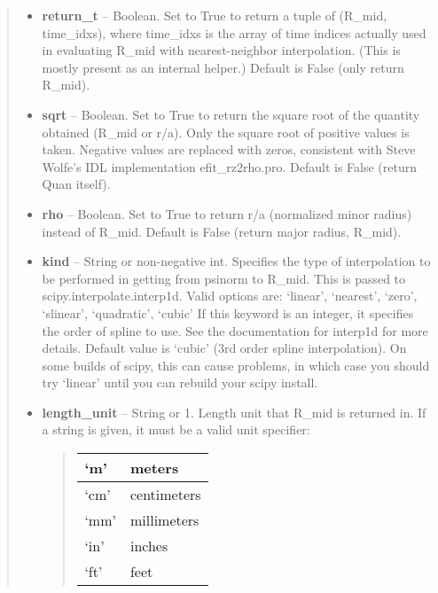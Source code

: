\documentclass[letterpaper,10pt,english]{sphinxmanual}
\begin{document}
\begin{fulllineitems}
\begin{fulllineitems}
\begin{quote}
\begin{description}
\begin{itemize}
\item {} 
\textbf{return\_t} --
Boolean.
Set to True to return a tuple of (R\_mid,
time\_idxs), where time\_idxs is the array of time indices
actually used in evaluating R\_mid with nearest-neighbor
interpolation. (This is mostly present as an internal helper.)
Default is False (only return R\_mid).

\item {} 
\textbf{sqrt} --
Boolean. Set to True to return the square root of the quantity
obtained (R\_mid or r/a). Only the square root of positive
values is taken. Negative values are replaced with zeros,
consistent with Steve Wolfe's IDL implementation efit\_rz2rho.pro.
Default is False (return Quan itself).

\item {} 
\textbf{rho} --
Boolean.
Set to True to return r/a (normalized minor radius)
instead of R\_mid. Default is False (return major radius, R\_mid).

\item {} 
\textbf{kind} --
String or non-negative int.
Specifies the type of interpolation
to be performed in getting from psinorm to R\_mid. This is
passed to scipy.interpolate.interp1d. Valid options are:
`linear', `nearest', `zero', `slinear', `quadratic', `cubic'
If this keyword is an integer, it specifies the order of spline
to use. See the documentation for interp1d for more details.
Default value is `cubic' (3rd order spline interpolation). On
some builds of scipy, this can cause problems, in which case
you should try `linear' until you can rebuild your scipy install.

\item {} 
\textbf{length\_unit} --
String or 1.
Length unit that R\_mid is returned in. If
a string is given, it must be a valid unit specifier:
\begin{quote}

\begin{tabulary}{\linewidth}{|L|L|}
\hline

`m'
 & 
meters
\\\hline

`cm'
 & 
centimeters
\\\hline

`mm'
 & 
millimeters
\\\hline

`in'
 & 
inches
\\\hline

`ft'
 & 
feet
\\\hline


\end{tabulary}
\end{quote}
\end{itemize}
\end{description}
\end{quote}
\end{fulllineitems}
\end{fulllineitems}
\end{document}
